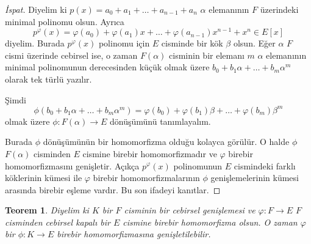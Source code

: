 \documentclass{article}
\newtheorem{thm}{Teorem}[section]
\theoremstyle{definition}
\theoremstyle{remark}
\begin{document}
            \begin{proof}[İspat]
                Diyelim ki $p(x) = a_0 + a_1 + \dots + a_{n - 1} + a_n$ $\alpha$ elemanının $F$ üzerindeki minimal polinomu olsun. Ayrıca
                \begin{equation*}
                    p^\varphi(x) = \varphi(a_0) + \varphi(a_1)x + \dots + \varphi(a_{n - 1})x^{n - 1} + x^n \in E[x]
                \end{equation*}
                diyelim. Burada $p^\varphi(x)$ polinomu için $E$ cisminde bir kök $\beta$ olsun. Eğer $\alpha$ $F$ cismi üzerinde cebirsel ise, o zaman $F(\alpha)$ cisminin bir elemanı $m$ $\alpha$ elemanının minimal polinomunun derecesinden küçük olmak üzere $b_0 + b_1\alpha + \dots + b_m\alpha^m$ olarak tek türlü yazılır.\par
                Şimdi
                \begin{equation*}
                    \phi(b_0 + b_1\alpha + \dots + b_m\alpha^m) = \varphi(b_0) + \varphi(b_1)\beta + \dots + \varphi(b_m)\beta^m
                \end{equation*}
                olmak üzere $\phi: F(\alpha) \to E$ dönüşümünü tanımlayalım.\par
                Burada $\phi$ dönüşümünün bir homomorfizma olduğu kolayca görülür. O halde $\phi$ $F(\alpha)$ cisminden $E$ cismine birebir homomorfizmadır ve $\varphi$ birebir homomorfizmasını genişletir. Açıkça $p^\varphi(x)$ polinomunun $E$ cismindeki farklı köklerinin kümesi ile $\varphi$ birebir homomorfizmalarının $\phi$ genişlemelerinin kümesi arasında birebir eşleme vardır. Bu son ifadeyi kanıtlar.
            \end{proof}
            
            \begin{thm}\label{3.17}
                Diyelim ki $K$ bir $F$ cisminin bir cebirsel genişlemesi ve $\varphi: F \to E$ $F$ cisminden cebirsel kapalı bir $E$ cismine birebir homomorfizma olsun. O zaman $\varphi$ bir $\phi: K \to E$ birebir homomorfizmasına genişletilebilir.
            \end{thm}
            
\end{document}
